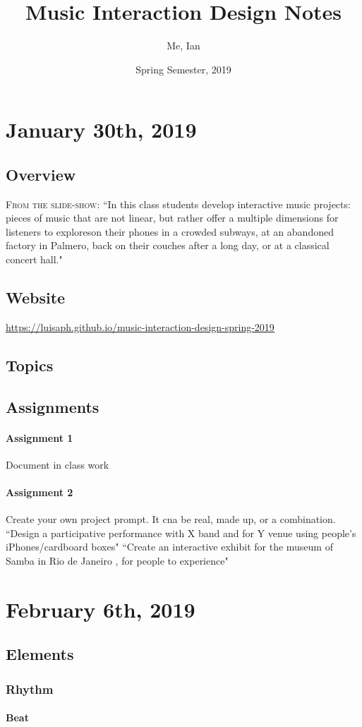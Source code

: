 \documentclass{article}
\title{Music Interaction Design Notes}
\author{Me, Ian}
\date{Spring Semester, 2019}
\begin{document}
	\maketitle
	
	\section*{January 30th, 2019}
	
	\subsection*{Overview}
	\textsc{From the slide-show}: ``In this class students develop interactive music projects: pieces of music that are not linear, but rather offer a multiple dimensions for listeners to explores\textemdash on their phones in a crowded subways, at an abandoned factory in Palmero, back on their couches after a long day, or at a classical concert hall."
	
	\subsection*{Website}
	\url{https://luisaph.github.io/music-interaction-design-spring-2019}
	
	\subsection*{Topics}
	
	\subsection*{Assignments}
	
	\paragraph{Assignment 1}
	Document in class work
	\paragraph{Assignment 2}
	Create your own project prompt. It cna be real, made up, or a combination. 
	``Design a participative performance with X band and for Y venue using people's iPhones/cardboard boxes" 
	``Create an interactive exhibit for the museum of Samba in Rio de Janeiro , for people to experience"
	
	\section*{February 6th, 2019}
	
	\subsection*{Elements}
	
	\subsubsection*{Rhythm}
	
	\paragraph{Beat}
	
	
\end{document}

